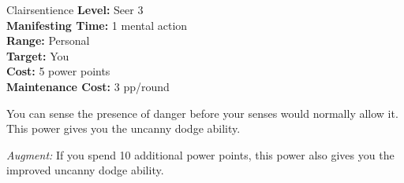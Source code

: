 {Clairsentience}
{
	\textbf{Level:}
	Seer 3\\
	\textbf{Manifesting Time:}
	1 mental action\\
	\textbf{Range:}
	Personal\\
	\textbf{Target:}
	You\\
	\textbf{Cost:}
	5 power points\\
	\textbf{Maintenance Cost:}
	3 pp/round\\
}
{
	You can sense the presence of danger before your senses would normally allow it. This power gives you the uncanny dodge ability.

	\textit{Augment:} If you spend 10 additional power points, this power also gives you the improved uncanny dodge ability.
}